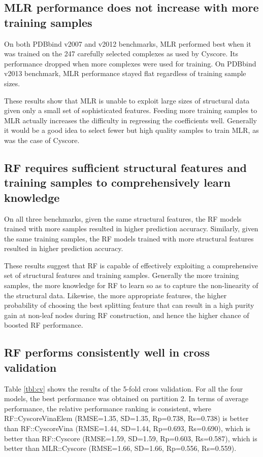 \documentclass[journal=jacsat,manuscript=article]{achemso}
\begin{document}
\subsection{MLR performance does not increase with more training samples}

On both PDBbind v2007 and v2012 benchmarks, MLR performed best when it was trained on the 247 carefully selected complexes as used by Cyscore. Its performance dropped when more complexes were used for training. On PDBbind v2013 benchmark, MLR performance stayed flat regardless of training sample sizes.

These results show that MLR is unable to exploit large sizes of structural data given only a small set of sophisticated features. Feeding more training samples to MLR actually increases the difficulty in regressing the coefficients well. Generally it would be a good idea to select fewer but high quality samples to train MLR, as was the case of Cyscore.

\subsection{RF requires sufficient structural features and training samples to comprehensively learn knowledge}

On all three benchmarks, given the same structural features, the RF models trained with more samples resulted in higher prediction accuracy. Similarly, given the same training samples, the RF models trained with more structural features resulted in higher prediction accuracy.

These results suggest that RF is capable of effectively exploiting a comprehensive set of structural features and training samples. Generally the more training samples, the more knowledge for RF to learn so as to capture the non-linearity of the structural data. Likewise, the more appropriate features, the higher probability of choosing the best splitting feature that can result in a high purity gain at non-leaf nodes during RF construction, and hence the higher chance of boosted RF performance.

\subsection{RF performs consistently well in cross validation}

Table \ref{tbl:cv} shows the results of the 5-fold cross validation. For all the four models, the best performance was obtained on partition 2. In terms of average performance, the relative performance ranking is consistent, where RF::CyscoreVinaElem (RMSE=1.35, SD=1.35, Rp=0.738, Rs=0.738) is better than RF::CyscoreVina (RMSE=1.44, SD=1.44, Rp=0.693, Rs=0.690), which is better than RF::Cyscore (RMSE=1.59, SD=1.59, Rp=0.603, Rs=0.587), which is better than MLR::Cyscore (RMSE=1.66, SD=1.66, Rp=0.556, Rs=0.559).
\end{document}
